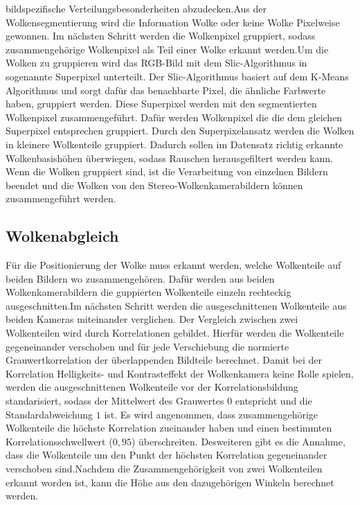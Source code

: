 \documentclass[a4paper,11pt,twoside,german]{article}
\newcommand{\absatz}{\smallbreak}
\begin{document}
bildspezifische Verteilungsbesonderheiten abzudecken.\absatz Aus der
Wolkensegmentierung wird die Information Wolke oder keine Wolke Pixelweise
gewonnen. Im nächsten Schritt werden die Wolkenpixel gruppiert, sodass
zusammengehörige Wolkenpixel als Teil einer Wolke erkannt werden.\absatz Um die
Wolken zu gruppieren wird das RGB-Bild mit dem Slic-Algorithmus in sogenannte
Superpixel unterteilt. Der Slic-Algorithmus basiert auf dem K-Means Algorithmus
und sorgt dafür das benachbarte Pixel, die ähnliche Farbwerte haben, gruppiert
werden. Diese Superpixel werden mit den segmentierten Wolkenpixel
zusammengeführt. Dafür werden Wolkenpixel die die dem gleichen Superpixel
entsprechen gruppiert. Durch den Superpixelansatz werden die Wolken in kleinere
Wolkenteile gruppiert.  Dadurch sollen im Datensatz richtig erkannte
Wolkenbasishöhen überwiegen, sodass Rauschen herausgefiltert werden kann.
\absatz Wenn die Wolken gruppiert sind, ist die Verarbeitung von einzelnen
Bildern beendet und die Wolken von den Stereo-Wolkenkamerabildern können
zusammengeführt werden.

\subsection{Wolkenabgleich}
Für die Positionierung der Wolke muss erkannt werden, welche Wolkenteile auf
beiden Bildern wo zusammengehören. Dafür werden aus beiden Wolkenkamerabildern
die guppierten Wolkenteile einzeln rechteckig ausgeschnitten.\absatz Im nächsten
Schritt werden die ausgeschnittenen Wolkenteile aus beiden Kameras miteinander
verglichen. Der Vergleich zwischen zwei Wolkenteilen wird durch Korrelationen
gebildet. Hierfür werden die Wolkenteile gegeneinander verschoben und für jede
Verschiebung die normierte Grauwertkorrelation der überlappenden Bildteile
berechnet. Damit bei der Korrelation Helligkeits- und Kontrasteffekt der
Wolkenkamera keine Rolle spielen, werden die ausgeschnittenen Wolkenteile vor
der Korrelationsbildung standarisiert, sodass der Mittelwert des Grauwertes $0$
entspricht und die Standardabweichung $1$ ist. Es wird angenommen, dass
zusammengehörige Wolkenteile die höchste Korrelation zueinander haben und einen
bestimmten Korrelationsschwellwert ($0,95$) überschreiten. Desweiteren gibt es
die Annahme, dass die Wolkenteile um den Punkt der höchsten Korrelation
gegeneinander verschoben sind.\absatz Nachdem die Zusammengehörigkeit von zwei
Wolkenteilen erkannt worden ist, kann die Höhe aus den dazugehörigen Winkeln
berechnet werden.
\end{document}
